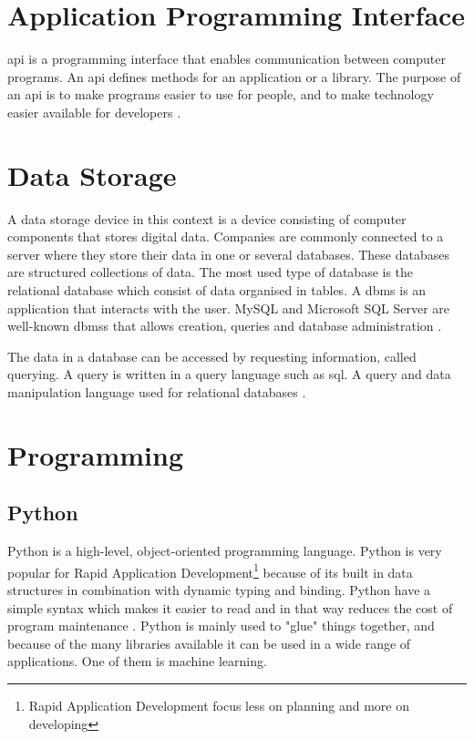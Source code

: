 \documentclass[english, a4paper]{report}
\begin{document}
{    \section{Application Programming Interface}
    {
        \Gls{api} is a programming interface that enables communication between computer programs. An \gls{api} defines methods for an application or a library. The purpose of an \gls{api} is to make programs easier to use for people, and to make technology easier available for developers \cite{azurePredictive}.
    }
    
    \section{Data Storage}
    {
        A data storage device in this context is a device consisting of computer components that stores digital data. Companies are commonly connected to a server where they store their data in one or several databases. These databases are structured collections of data. The most used type of database is the relational database which consist of data organised in tables. A \gls{dbms} is an application that interacts with the user. MySQL and Microsoft SQL Server are well-known \gls{dbms}s that allows creation, queries and database administration \cite{databaseSystems}. 
        \par 
        The data in a database can be accessed by requesting information, called querying. A query is written in a query language such as \gls{sql}. A query and data manipulation language used for relational databases \cite{HeadFirstSQL}.
    }
    
    \section{Programming}
    {
        \subsection{Python}\label{pythonTheory}
        {
            Python is a high-level, object-oriented programming language. Python is very popular for Rapid Application Development\footnote{Rapid Application Development focus less on planning and more on developing} because of its built in data structures in combination with dynamic typing and binding. Python have a simple syntax which makes it easier to read and in that way reduces the cost of program maintenance \cite{python}. Python is mainly used to "glue" things together, and because of the many libraries available it can be used in a wide range of applications. One of them is machine learning. 
        }
        
}}
\end{document}
